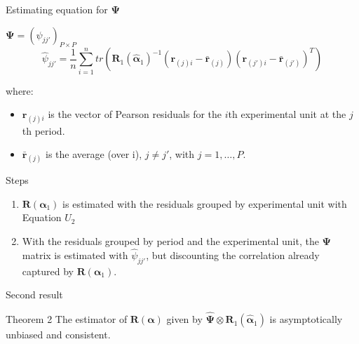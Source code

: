 \documentclass[t,9pt]{beamer}
\begin{document}
 \begin{frame}[fragile]{Estimating equation for $\pmb{\Psi}$}
 \begin{block}{ $\pmb{\Psi}=\left(\psi_{jj'}\right)_{P\times P}$}
 \begin{equation}\nonumber
\hat{\psi}_{jj'}=\frac{1}{n} \sum_{i=1}^n tr\left(\pmb{R}_1(\pmb{\hat{\alpha}}_1)^{-1}(\pmb{r}_{(j)i}-\bar{\pmb{r}}_{(j)})(\pmb{r}_{(j')i}-\bar{\pmb{r}}_{(j')})^T\right)
\end{equation}
 \end{block}
 where:
 \begin{itemize}
     \item $\pmb{r}_{(j)i}$ is the vector of Pearson residuals for the $i$th experimental unit at the $j$th  period.
     \item $\bar{\pmb{r}}_{(j)}$ is the average (over i),  $j\neq j'$, with $j= 1, \ldots, P$.
 \end{itemize}
\begin{block}{Steps}
\begin{enumerate}
    \item  $\pmb{R}(\pmb{\alpha}_1)$ is estimated with the residuals grouped by experimental unit with Equation $U_2$
    \item With the residuals grouped by period and the experimental unit, the $\pmb{\Psi}$ matrix is estimated with $\hat{\psi}_{jj'}$, but discounting the correlation already captured by $\pmb{R}(\pmb{\alpha}_1)$.    
\end{enumerate}
\end{block} 
 \end{frame}

\begin{frame}[fragile]{Second result}
\vfill
 \begin{block}{Theorem 2}
The estimator of $\pmb{R}(\pmb{\alpha})$ given by $\pmb{\hat{\Psi}}\otimes\pmb{R}_1(\pmb{\hat{\alpha}}_1)$ is asymptotically unbiased and consistent. 
 \end{block}
 
\end{frame}
\end{document}
